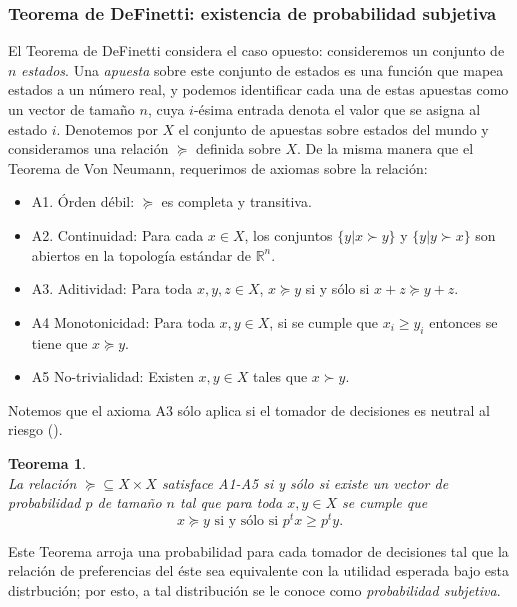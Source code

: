 \documentclass[11pt]{article}
\theoremstyle{plain}
\newtheorem{teo}{Teorema}
\begin{document}
		\subsubsection{Teorema de DeFinetti: existencia de probabilidad subjetiva}
		El Teorema de DeFinetti considera el caso opuesto: consideremos un conjunto de  $n$ \textit{estados}. Una \textit{apuesta} sobre este conjunto de estados es una función que mapea estados a un número real, y podemos identificar cada una de estas apuestas como un vector de tamaño $n$, cuya $i$-ésima entrada denota el valor que se asigna al estado $i$. Denotemos por $X$ el conjunto de apuestas sobre estados del mundo y consideramos una relación $\succeq$ definida sobre $X$. De la misma manera que el Teorema de Von Neumann, requerimos de axiomas sobre la relación:
\begin{itemize}
\item A1. Órden débil: $\succeq$ es completa y transitiva.
\item A2. Continuidad: Para cada $x \in X$, los conjuntos $\{ y | x \succ y \}$ y $\{ y | y \succ x \}$ son abiertos en la topología estándar de $\mathbb{R}^n$.
\item A3. Aditividad: Para toda $x,y,z \in X$, $x \succeq y$ si y sólo si $x+z \succeq y+z$.
\item A4 Monotonicidad: Para toda $x,y \in X$, si se cumple que $x_i \geq y_i$ entonces se tiene que $x \succeq y$.
\item A5 No-trivialidad: Existen $x,y \in X$ tales que $x \succ y$.
\end{itemize}
Notemos que el axioma A3 sólo aplica si el tomador de decisiones es neutral al riesgo (\cite{gilboa2009decision}).
\begin{teo}{\cite{definetti1937}}\\
La relación $\succeq \subseteq X \times X$ satisface A1-A5 si y sólo si existe un vector de probabilidad $p$ de tamaño $n$ tal que para toda $x,y \in X$ se cumple que
\[ x \succeq y \textrm { si y sólo si } p^t x \geq p^t y. \]
\end{teo}
Este Teorema arroja una probabilidad para cada tomador de decisiones tal que la relación de preferencias del éste sea equivalente con la utilidad esperada bajo esta distrbución; por esto, a tal distribución se le conoce como \textit{probabilidad subjetiva}.
\end{document}
